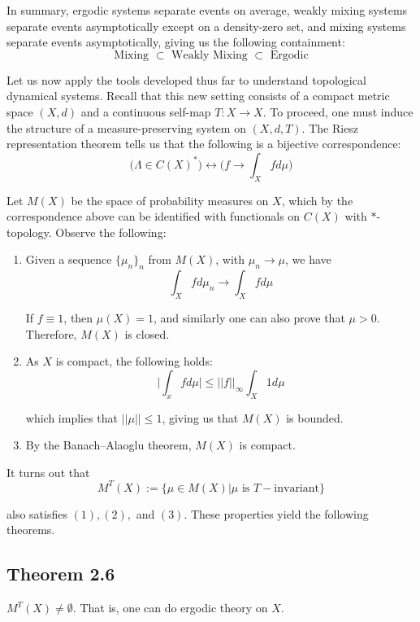 \documentclass[11pt,a4paper]{article}
\begin{document}


In summary, ergodic systems separate events on average, weakly mixing systems
separate events asymptotically except on a density-zero set, and mixing
systems separate events asymptotically, giving us the following containment:
$$\text{Mixing } \subset \text{ Weakly Mixing } \subset \text{ Ergodic}$$


Let us now apply the tools developed thus far to understand topological
dynamical systems. Recall that this new setting consists of a compact metric
space $(X,d)$ and a continuous self-map $T:X\rightarrow X$. To proceed, one
must induce the structure of a measure-preserving system on $(X,d,T)$. The
Riesz representation theorem tells us that the following is a bijective
correspondence:
$$\big(\Lambda \in C(X)^*\big) \longleftrightarrow \Bigg(f\rightarrow \int_Xfd\mu\Bigg)$$

Let $M(X)$ be the space of probability measures on $X$, which by the correspondence above can be identified with functionals on $C(X)$ with $*$-topology. Observe the following:
\begin{enumerate}
    \item Given a sequence $\{\mu_n\}_n$ from $M(X)$, with $\mu_n\rightarrow \mu$, we have
    $$\int_Xfd\mu_n \rightarrow \int_Xfd\mu$$

    If $f \equiv 1$, then $\mu(X) = 1$, and similarly one can also prove that $\mu > 0$. Therefore, $M(X)$ is closed.
    \item As $X$ is compact, the following holds:
    $$\Bigg|\int_xfd\mu\Bigg|\leq ||f||_{\infty}\int_X1d\mu$$

    which implies that $||\mu|| \leq 1$, giving us that $M(X)$ is bounded.
    \item By the Banach--Alaoglu theorem, $M(X)$ is compact.
\end{enumerate}


It turns out that
$$M^T(X) := \{\mu\in M(X) |  \mu \text{ is }T-\text{invariant}\}$$

also satisfies $(1), (2), $ and $(3)$. These properties yield the following theorems.
\subsection*{Theorem 2.6}
    $M^T(X) \neq \emptyset$. That is, one can do ergodic theory on $X$.
\end{document}
